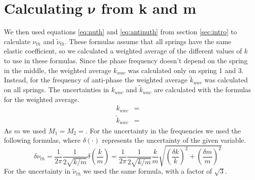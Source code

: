 \documentclass{article}
\begin{document}
\section{Calculating $\bm \nu$ from k and m} \label{sec:nukm}

We then used equations \ref{eq:nuth} and \ref{eq:antinuth} from section \ref{sec:intro} to calculate $\nu_{th}$
and $\tilde \nu_{th}$. These formulas assume that all springs have
the same elastic coefficient, so we calculated a weighted average of
the different values of $k$ to use in these formulas. Since the phase
frequency doesn't depend on the spring in the middle, the
weighted average $k_{wav}$ was calculated only on spring 1 and 3.
Instead, for the frequency of anti-phase the weighted average 
$\tilde k_{wav}$ was calculated on all springs. The uncertainties in $k_{wav}$ and $\tilde k_{wav}$ are calculated with the formulas for the weighted average. 
\begin{align}
           k_{wav} &= \\
    \tilde k_{wav} &=
\end{align}
As $m$ we used $M_1=M_2=$.
For the uncertainty in the frequencies we used the following formulas, where $\delta(\cdot)$ represents the uncertainty of the given variable.
\begin{equation} \label{eq:inc_nuth}
    \delta \nu_{th}
    = \frac{1}{2\pi} \frac{1}{2\sqrt{k/m}} \delta \left ( \frac{k}{m} \right )
    = \frac{1}{2\pi} \frac{1}{2\sqrt{k/m}}  \frac{k}{m} \sqrt{ \left ( \frac{ \delta k}{k}  \right ) ^2 +
           \left ( \frac{ \delta m}{m}  \right ) ^2}
\end{equation}
For the uncertainty in $\tilde \nu_{th}$ we used the same formula, with a factor of $\sqrt 3$.
\end{document}

